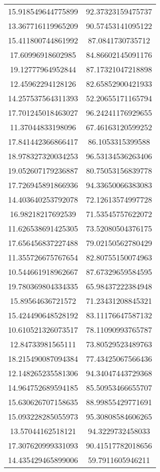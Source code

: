 \begin{table}
\begin{tabular}{cc}
15.918549644775899 & 92.37323159475737 \\
13.367716119965209 & 90.57453141095122 \\
15.411800744861992 & 87.0841730735712 \\
17.60996918602985 & 84.86602145091176 \\
19.12777964952844 & 87.17321047218898 \\
12.45962294128126 & 82.65852900421933 \\
14.257537564311393 & 52.20655171165794 \\
17.701245018463027 & 96.24241176929655 \\
11.37044833198096 & 67.46163120599252 \\
17.841442366866417 & 86.1053315399588 \\
18.978327320034253 & 96.53134536263406 \\
19.052607179236887 & 80.75053156839778 \\
17.726945891866936 & 94.33650066383083 \\
14.403640253792078 & 72.12613574997728 \\
16.98218217692539 & 71.53545757622072 \\
11.626538691425305 & 73.52080504376175 \\
17.656456837227488 & 79.02150562780429 \\
11.355726675767654 & 82.80755150074963 \\
10.544661918962667 & 87.67329659584595 \\
19.780369804334335 & 65.98437222384948 \\
15.89564636721572 & 71.23431208845321 \\
15.424490648528192 & 83.11176647587132 \\
10.610521326073517 & 78.11090993765787 \\
12.84733981565111 & 73.80529523489763 \\
18.215490087094384 & 77.43425067566436 \\
12.148265235581306 & 94.34047443729368 \\
14.964752689594185 & 85.50953466655707 \\
15.630626707158635 & 88.99855429771691 \\
15.093228285055973 & 95.30808584606265 \\
13.57044162518121 & 94.3229732458033 \\
17.307620999331093 & 90.41517782018656 \\
14.435429465899006 & 59.7911605946211 \\

\end{tabular}
\end{table}
